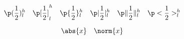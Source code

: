 \[
    \p ( \frac12  )_l^h \quad
    \p [ \frac12  ]_l^h \quad
    \p\{ \frac12 \}_l^h \quad
    \p | \frac12  |_l^h \quad
    \p\| \frac12 \|_l^h \quad
    \p < \frac12  >_l^h
\]

\[
    \abs  { x } \quad
    \norm { x }
\]
